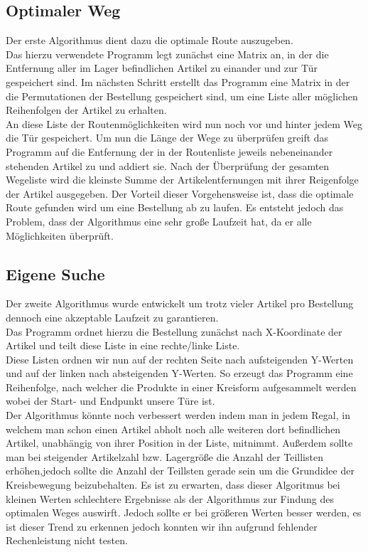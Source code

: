 \documentclass[pagenumoff]{kit-document}
\begin{document}
\subsection{Optimaler Weg}
Der erste Algorithmus dient dazu die optimale Route auszugeben.\\ Das hierzu verwendete Programm legt zunächst eine Matrix an, in der die Entfernung aller im Lager befindlichen Artikel zu einander und zur Tür gespeichert sind. Im nächsten Schritt erstellt das Programm eine Matrix in der die Permutationen der Bestellung gespeichert sind, um eine Liste aller möglichen Reihenfolgen der Artikel zu erhalten. \\An diese Liste der Routenmöglichkeiten wird nun noch vor und hinter jedem Weg die Tür gespeichert. Um nun die Länge der Wege zu überprüfen greift das Programm auf die Entfernung der in der Routenliste jeweils nebeneinander stehenden Artikel  zu und addiert sie. Nach der Überprüfung der gesamten Wegeliste wird die kleinste Summe der Artikelentfernungen mit ihrer Reigenfolge der Artikel ausgegeben. Der Vorteil dieser Vorgehensweise ist, dass die optimale Route gefunden wird um eine Bestellung ab zu laufen. Es entsteht jedoch das Problem, dass der Algorithmus eine sehr große Laufzeit hat, da er alle Möglichkeiten überprüft.
\subsection{Eigene Suche}
Der zweite Algorithmus wurde entwickelt um trotz vieler Artikel pro Bestellung dennoch eine akzeptable Laufzeit zu garantieren.\\ Das Programm ordnet hierzu die Bestellung zunächst nach X-Koordinate der Artikel und teilt diese Liste in eine rechte/linke Liste.\\ Diese Listen ordnen wir nun auf der rechten Seite nach aufsteigenden Y-Werten und auf der linken nach absteigenden Y-Werten. So erzeugt das Programm eine Reihenfolge, nach welcher die Produkte in einer Kreisform aufgesammelt werden wobei der Start- und Endpunkt unsere Türe ist.\\
Der Algorithmus könnte noch verbessert werden indem man in jedem Regal, in welchem man schon einen Artikel abholt noch alle weiteren dort befindlichen Artikel, unabhängig von ihrer Position in der Liste, mitnimmt. Außerdem sollte man bei steigender Artikelzahl bzw. Lagergröße die Anzahl der Teillisten erhöhen,jedoch sollte die Anzahl der Teillsten gerade sein um die Grundidee der Kreisbewegung beizubehalten. 
Es ist zu erwarten, dass dieser Algoritmus bei kleinen Werten schlechtere Ergebnisse als der Algorithmus zur Findung des optimalen Weges auswirft. Jedoch sollte er bei größeren Werten besser werden, es ist dieser Trend zu erkennen jedoch konnten wir ihn aufgrund fehlender Rechenleistung nicht testen.
\end{document}
